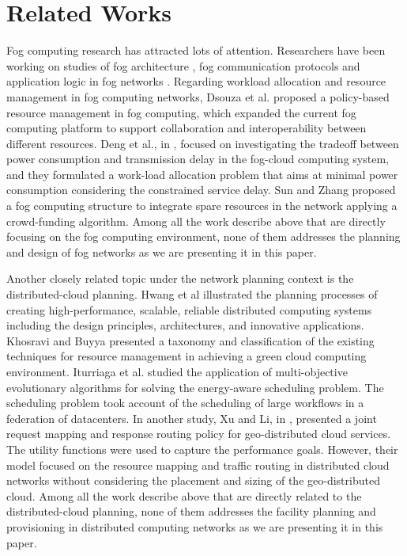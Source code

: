 \documentclass[10pt,journal,compsoc]{IEEEtran}
\begin{document}
\section{Related Works}\label{relwork}
Fog computing research has attracted lots of attention. Researchers have been working on studies of fog architecture \cite{fcsmartcity}, fog communication protocols \cite{Peng:2016:FRA:3029494.3029575} and application logic in fog networks \cite{SUN2017687}. Regarding workload allocation and resource management in fog computing networks, Dsouza et al.\cite{secme} proposed a policy-based resource management in fog computing, which expanded the current fog computing platform to support collaboration and interoperability between different resources. Deng et al., in \cite{fcworkload}, focused on investigating the tradeoff between power consumption and transmission delay in the fog-cloud computing system, and they formulated a work-load allocation problem that aims at minimal power consumption considering the constrained service delay. Sun and Zhang \cite{SUN2017687} proposed a fog computing structure to integrate spare resources in the network applying a crowd-funding algorithm.
Among all the work describe above that are directly focusing on the fog computing environment, none of them addresses the planning and design of fog networks as we are presenting it in this paper. 

Another closely related topic under the network planning context is the distributed-cloud planning. 
Hwang et al \cite{hwang2013distributed} illustrated the planning processes of creating high-performance, scalable, reliable distributed computing systems including the design principles, architectures, and innovative applications. 
Khosravi and Buyya \cite{enerfoot} presented a taxonomy and classification of the existing techniques for resource management in achieving a green cloud computing environment. 
Iturriaga et al. \cite{ITOR:ITOR12294} studied the application of multi-objective evolutionary algorithms for solving the energy-aware scheduling problem. The scheduling problem took account of the scheduling of large workflows in a federation of datacenters. In another study, Xu and Li, in \cite{6566873}, presented a joint request mapping and response routing policy for geo-distributed cloud services. The utility functions were used to capture the performance goals. However, their model focused on the resource mapping and traffic routing in distributed cloud networks without considering the placement and sizing of the geo-distributed cloud. 
Among all the work describe above that are directly related to the distributed-cloud planning, none of them addresses the facility planning and provisioning in distributed computing networks as we are presenting it in this paper.
\end{document}
